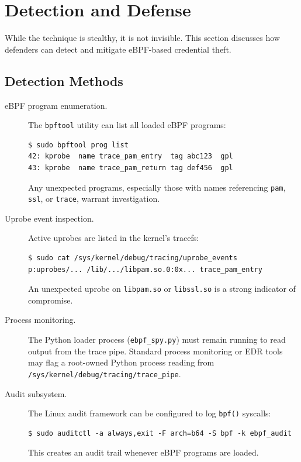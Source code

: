 \documentclass[11pt,a4paper]{article}
\begin{document}
\section{Detection and Defense}
\label{sec:detection}

While the technique is stealthy, it is not invisible. This section discusses
how defenders can detect and mitigate eBPF-based credential theft.

\subsection{Detection Methods}
\label{subsec:detection_methods}

\begin{description}
    \item[eBPF program enumeration.]
        The \texttt{bpftool} utility can list all loaded eBPF programs:
        \begin{lstlisting}[style=shellstyle]
$ sudo bpftool prog list
42: kprobe  name trace_pam_entry  tag abc123  gpl
43: kprobe  name trace_pam_return tag def456  gpl
        \end{lstlisting}
        Any unexpected programs, especially those with names referencing
        \texttt{pam}, \texttt{ssl}, or \texttt{trace}, warrant investigation.

    \item[Uprobe event inspection.]
        Active uprobes are listed in the kernel's tracefs:
        \begin{lstlisting}[style=shellstyle]
$ sudo cat /sys/kernel/debug/tracing/uprobe_events
p:uprobes/... /lib/.../libpam.so.0:0x... trace_pam_entry
        \end{lstlisting}
        An unexpected uprobe on \texttt{libpam.so} or \texttt{libssl.so} is a
        strong indicator of compromise.

    \item[Process monitoring.]
        The Python loader process (\texttt{ebpf\_spy.py}) must remain running
        to read output from the trace pipe. Standard process monitoring or EDR
        tools may flag a root-owned Python process reading from
        \texttt{/sys/kernel/debug/tracing/trace\_pipe}.

    \item[Audit subsystem.]
        The Linux audit framework can be configured to log \texttt{bpf()}
        syscalls:
        \begin{lstlisting}[style=shellstyle]
$ sudo auditctl -a always,exit -F arch=b64 -S bpf -k ebpf_audit
        \end{lstlisting}
        This creates an audit trail whenever eBPF programs are loaded.
\end{description}
\end{document}
